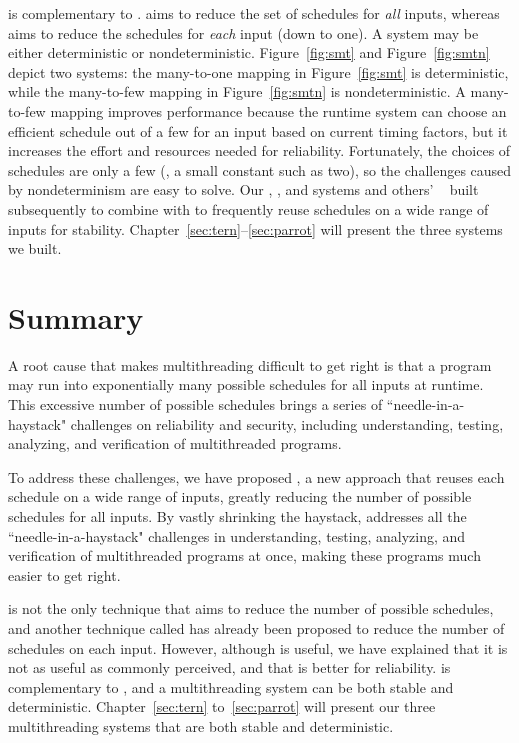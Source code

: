\dmt is complementary to \smt. \smt aims to reduce the set of schedules for
\emph{all} inputs, whereas \dmt aims to reduce the schedules for \emph{each}
input (down to one).  A \smt system may be either deterministic or
nondeterministic. Figure~\ref{fig:smt} and Figure~\ref{fig:smtn} depict two \smt
systems: the many-to-one mapping in Figure~\ref{fig:smt} is deterministic, while
the many-to-few mapping in Figure~\ref{fig:smtn} is nondeterministic.  A
many-to-few mapping improves performance because the runtime system can choose
an efficient schedule out of a few for an input based on current timing factors,
but it increases the effort and resources needed for reliability.  Fortunately,
the choices of schedules are only a few (\eg, a small constant such as two), so
the challenges caused by nondeterminism are easy to solve. Our \tern,
\peregrine, and \parrot systems and others' \dthreads~\cite{dthreads:sosp11}
built subsequently to \tern combine \dmt with \smt to frequently reuse schedules
on a wide range of inputs for stability.
Chapter~\ref{sec:tern}--\ref{sec:parrot} will present the three systems we
built.

\section{Summary} \label{sec:smt-summary}

A root cause that makes multithreading difficult to get right is that a 
program may run into exponentially many possible schedules for all inputs 
at runtime. This excessive number of possible schedules brings a series of 
``needle-in-a-haystack" challenges on reliability and security, including 
understanding, testing, analyzing, and verification of multithreaded programs. 

To address these challenges, we have proposed \smt, a new approach that reuses 
each schedule on a wide range of inputs, greatly reducing the number of 
possible schedules for all inputs. By vastly shrinking the haystack, \smt 
addresses all the ``needle-in-a-haystack" challenges in understanding, testing, 
analyzing, and verification of multithreaded programs at once, making these 
programs much easier to get right.

\smt is not the only technique that aims to reduce the number of possible 
schedules, and another technique called \dmt has already been proposed to 
reduce the number of schedules on each input. However, although \dmt is useful, 
we have explained that it is not as useful as commonly perceived, and that \smt 
is better for reliability. \smt is complementary to \dmt, and a multithreading 
system can be both stable and deterministic. Chapter~\ref{sec:tern} 
to~\ref{sec:parrot} will present our three multithreading systems that are both 
stable and deterministic.
